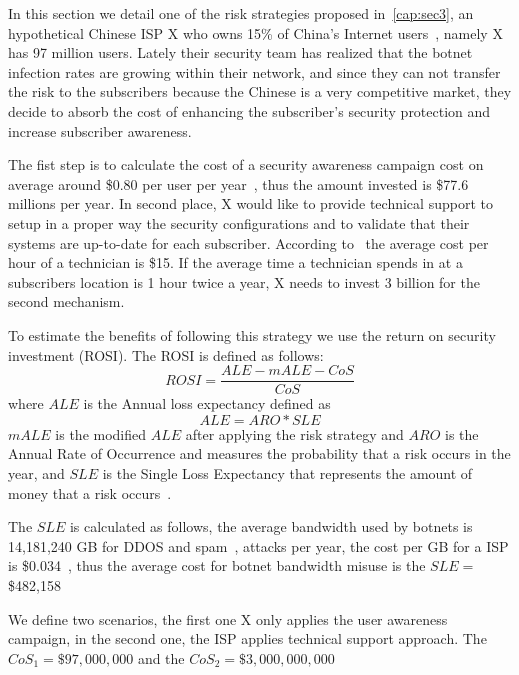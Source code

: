 
In this section we detail one of the risk strategies proposed in~\ref{cap:sec3}, an hypothetical Chinese ISP X who owns 15\% of China's Internet users~\cite{china_i_users}, namely X has 97 million users. Lately their security team has realized that the botnet infection rates are growing within their network, and since they can not transfer the risk to the subscribers because the Chinese is a very competitive market, they decide to absorb the cost of enhancing the subscriber's security protection and increase subscriber awareness.

The fist step is to calculate the cost of a security awareness campaign cost on average around \$0.80 per user per year~\cite{report}, thus the amount invested is \$77.6 millions per year.
In second place, X would like to provide technical support to setup in a proper way the security configurations and to validate that their systems are up-to-date for each subscriber. According to~\cite{pay} the average cost per hour of a technician is \$15. If the average time a technician spends in at a subscribers location is 1 hour twice a year, X needs to invest 3 billion for the second mechanism.

To estimate the benefits of following this strategy we use the return on security investment (ROSI). The ROSI is defined as follows:
\[ROSI = \frac{ALE -mALE -CoS}{CoS}\]
where $ALE$ is the Annual loss expectancy defined as \[ALE=ARO*SLE\] $mALE$ is the modified $ALE$ after applying the risk strategy and $ARO$ is the Annual Rate of Occurrence and measures the probability that a risk occurs in the year, and $SLE$ is the Single Loss Expectancy that represents the amount of money that a risk occurs~\cite{ROSI}.

The $SLE$ is calculated as follows, the average bandwidth used by botnets is 14,181,240 GB for DDOS and spam~\cite{spam,ddos}, attacks per year, the cost per GB for a ISP is \$0.034~\cite{gb_cost}, thus the average cost for botnet bandwidth misuse is the $SLE=$\$482,158

We define two scenarios, the first one X only applies the user awareness campaign, in the second one, the ISP applies technical support approach. The $CoS_1 =\$ 97,000,000$ and the $CoS_2=\$3,000,000,000$


